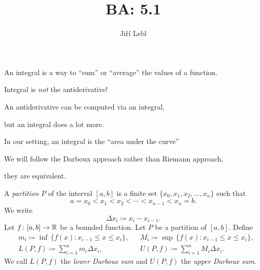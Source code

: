 \documentclass[10pt,aspectratio=169]{beamer}
\author{Ji\v{r}\'i Lebl}
\institute[OSU]{%
Departemento pri Matematiko de Oklahoma {\^S}tata Universitato}
\title{BA: 5.1}
\date{}
\begin{document}
\begin{frame}
\titlepage
\end{frame}

\begin{frame}
An integral is a way to ``sum'' or ``average'' the values of a function.

\pause
\medskip

Integral is \emph{not} the antiderivative!

\pause
\medskip

An antiderivative can be computed via an integral,

\pause
but an integral does a lot more.

\pause
\medskip

In our setting, an integral is the ``area under the curve''

\pause
\medskip

We will follow the Darboux approach rather than Riemann approach,

they are equivalent.
\end{frame}

\begin{frame}

\begin{definition}
A \emph{partition} $P$ of the interval $[a,b]$ is
a finite set $\{ x_0,x_1,x_2,\ldots,x_n \}$ such that
\begin{equation*}
a = x_0 < x_1 < x_2 < \cdots < x_{n-1} < x_n = b .
\end{equation*}
\pause
We write
\begin{equation*}
\Delta x_i \coloneqq x_i - x_{i-1} .
\end{equation*}
\pause
Let $f \colon [a,b] \to {\mathbb{R}}$ be a bounded function.
\pause
Let $P$ be a partition of
$[a,b]$.
\pause
Define
\begin{align*}
& m_i \coloneqq \inf \, \bigl\{ f(x) : x_{i-1} \leq x \leq x_i \bigr\} , &
& M_i \coloneqq \sup \, \bigl\{ f(x) : x_{i-1} \leq x \leq x_i \bigr\} , \\
& L(P,f) \coloneqq
\sum_{i=1}^n m_i \Delta x_i , &
& U(P,f) \coloneqq
\sum_{i=1}^n M_i \Delta x_i .
\end{align*}
\pause
We call $L(P,f)$ the \emph{lower Darboux sum} and
$U(P,f)$ the \emph{upper Darboux sum}.
\end{definition}

\end{frame}
\end{document}
